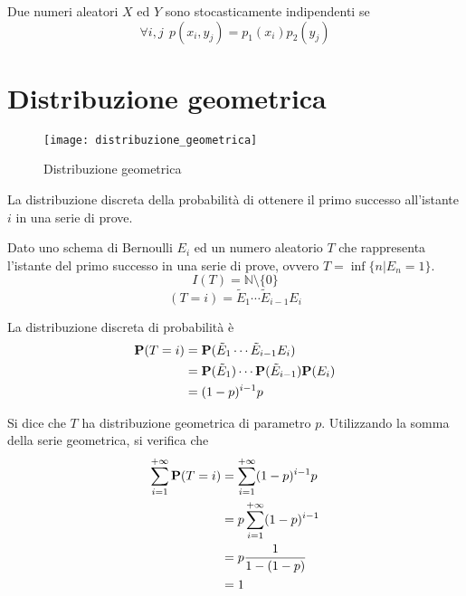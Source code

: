 \begin{definition}
  Due numeri aleatori \( X \) ed \( Y \) sono stocasticamente indipendenti se
  \[
    \forall i,j ~~ p(x_i, y_j) = p_1(x_i) p_2(y_j)
  \]
\end{definition}


\section{Distribuzione geometrica} %
\begin{figure*}
  \texttt{[image: distribuzione\_geometrica]}
  \caption{Distribuzione geometrica} 
\end{figure*}

\begin{definition}\label{def:distribuzione_geometrica}
  La distribuzione discreta della probabilità di ottenere il primo successo all'istante $i$ in una serie di prove.
\end{definition}

Dato uno schema di Bernoulli \( E_i \) ed un numero aleatorio \( T \) che rappresenta l'istante del primo successo in una serie di prove, ovvero \( T = \inf\{ n | E_n = 1 \} \).
\[
  I(T) = \mathbb{N} \setminus \{ 0 \}
\]
\[
  (T = i) = \tilde{E}_1 \cdots \tilde{E}_{i-1} E_i
\]

La distribuzione discreta di probabilità è
\begin{align*}
  \mathbf{P}(T = i) &= \mathbf{P}(\tilde{E}_1 \cdots \tilde{E}_{i-1} E_i) \\
  &= \mathbf{P}(\tilde{E}_1) \cdots \mathbf{P}(\tilde{E}_{i-1}) \mathbf{P}(E_i) \\
  &= (1-p)^{i-1} p  
\end{align*}

Si dice che \( T \) ha distribuzione geometrica di parametro \( p \).
Utilizzando la somma della serie geometrica, si verifica che
\begin{align*}
  \sum_{i=1}^{+ \infty} \mathbf{P}(T = i) &= \sum_{i=1}^{+ \infty} (1-p)^{i-1} p \\
  &= p \sum_{i=1}^{+ \infty} (1-p)^{i-1}  \\
  &= p \frac{1}{1-(1-p)} \\
  &= 1
\end{align*}


